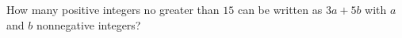 How many positive integers no greater than $15$ can be written as $3a+5b$ with $a$ and $b$ nonnegative integers?
